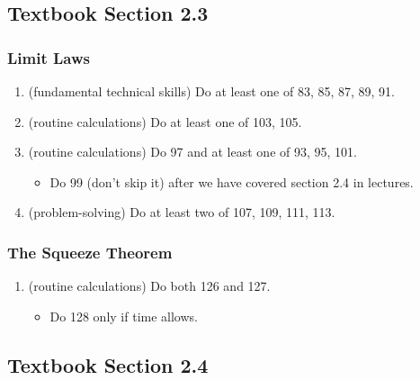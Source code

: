 \documentclass[../main.tex]{subfiles}
\begin{document}
\subsection*{Textbook Section 2.3} 

\subsubsection*{Limit Laws}
\begin{enumerate}
  \item (fundamental technical skills) Do at least one of 83, 85, 87, 89, 91.
  \item (routine calculations) Do at least one of 103, 105.
  \item (routine calculations) Do 97 and at least one of 93, 95, 101.
    \begin{itemize}
      \item Do 99 (don't skip it) after we have covered section 2.4 in lectures.
    \end{itemize}
  \item (problem-solving) Do at least two of 107, 109, 111, 113. 
\end{enumerate}

\subsubsection{The Squeeze Theorem}
\begin{enumerate}
  \item (routine calculations) Do both 126 and 127.
    \begin{itemize}
      \item Do 128 only if time allows. 
    \end{itemize}
\end{enumerate}

\subsection*{Textbook Section 2.4}
\end{document}
